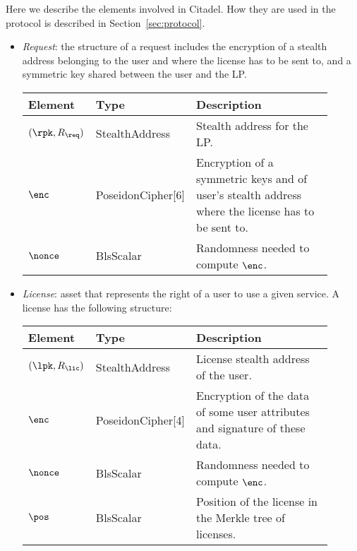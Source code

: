 

Here we describe the elements involved in Citadel. How they are used in the protocol is described in Section~\ref{sec:protocol}.

\begin{itemize}
	\itemsep1em 
	\item \emph{Request}: the structure of a request includes the encryption of a stealth address belonging to the user and where the license has to be sent to, and a symmetric key shared between the user and the LP.
	
	\vspace{0.1cm}
	\begin{center}
		\begin{tabular}{ | p{0.15\linewidth} | p{0.2\linewidth} | p{0.55\linewidth} | } 
		\hline
		{Element} & {Type} & {Description} \\
		\hline
		$(\rpk, R_{\req})$ & StealthAddress & Stealth address for the LP. \\
		$\enc$ & PoseidonCipher[6] & Encryption of a symmetric keys and of user's stealth address where the license has to be sent to. \\
		$\nonce$ & BlsScalar & Randomness needed to compute $\enc$. \\ 
		\hline
		\end{tabular}
	\end{center}
	
	\item \emph{License}: asset that represents the right of a user to use a given service. A license has the following structure:
	
	\vspace{0.1cm}
    \begin{center}
		\begin{tabular}{ | p{0.15\linewidth} | p{0.2\linewidth} | p{0.55\linewidth} | } 
		\hline
			{Element} & {Type} & {Description} \\
		\hline
		$(\lpk, R_{\lic})$ & StealthAddress & License stealth address of the user. \\
		$\enc$ & PoseidonCipher[4] & Encryption of the data of some user attributes and signature of these data. \\
		$\nonce$ & BlsScalar & Randomness needed to compute $\enc$. \\ 
		$\pos$ & BlsScalar & Position of the license in the Merkle tree of licenses. \\ 
		\hline
		\end{tabular}
	\end{center}


\end{itemize}
